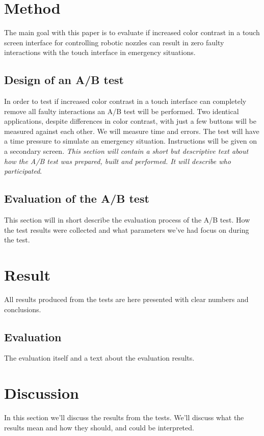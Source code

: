 \documentclass[runningheads,a4paper,oribibl]{llncs}
\begin{document}
\section{Method}
The main goal with this paper is to evaluate if increased color contrast in a touch screen interface for controlling robotic nozzles can result in zero faulty interactions with the touch interface in emergency situations.

\subsection{Design of an A/B test}
In order to test if increased color contrast in a touch interface can  completely remove all faulty interactions an A/B test will be performed. Two identical applications, despite differences in color contrast, with just a few buttons will be measured against each other. We will measure time and errors. The test will have a time pressure to simulate an emergency situation. Instructions will be given on a secondary screen.
\emph{This section will contain a short but descriptive text about how the A/B test was prepared, built and performed. It will describe who participated}.

\subsection{Evaluation of the A/B test}
This section will in short describe the evaluation process of the A/B test. How the test results were collected and what parameters we've had focus on during the test.

\section{Result}
All results produced from the tests are here presented with clear numbers and conclusions.

\subsection{Evaluation}
The evaluation itself and a text about the evaluation results.

\section{Discussion}
In this section we'll discuss the results from the tests. We'll discuss what the results mean and how they should, and could be interpreted.
\end{document}
